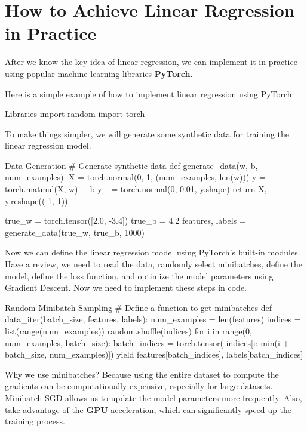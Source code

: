 \section{How to Achieve Linear Regression in Practice}

After we know the key idea of linear regression, we can implement it in practice using popular machine learning libraries \textbf{PyTorch}.

Here is a simple example of how to implement linear regression using PyTorch:

\begin{pythoncode}{Libraries}
import random
import torch
\end{pythoncode}

To make things simpler, we will generate some synthetic data for training the linear regression model.

\begin{pythoncode}{Data Generation}
# Generate synthetic data
def generate_data(w, b, num_examples):
    X = torch.normal(0, 1, (num_examples, len(w)))
    y = torch.matmul(X, w) + b
    y += torch.normal(0, 0.01, y.shape)
    return X, y.reshape((-1, 1))

true_w = torch.tensor([2.0, -3.4])
true_b = 4.2
features, labels = generate_data(true_w, true_b, 1000)
\end{pythoncode}

Now we can define the linear regression model using PyTorch's built-in modules. Have a review, we need to read the data, randomly select minibatches, define the model, define the loss function, and optimize the model parameters using Gradient Descent. Now we need to implement these steps in code.

\begin{pythoncode}{Random Minibatch Sampling}
# Define a function to get minibatches
def data_iter(batch_size, features, labels):
    num_examples = len(features)
    indices = list(range(num_examples))
    random.shuffle(indices)
    for i in range(0, num_examples, batch_size):
        batch_indices = torch.tensor(
            indices[i: min(i + batch_size, num_examples)])
        yield features[batch_indices], labels[batch_indices]
\end{pythoncode}

Why we use minibatches? Because using the entire dataset to compute the gradients can be computationally expensive, especially for large datasets. Minibatch SGD allows us to update the model parameters more frequently. Also, take advantage of the \textbf{GPU} acceleration, which can significantly speed up the training process.

